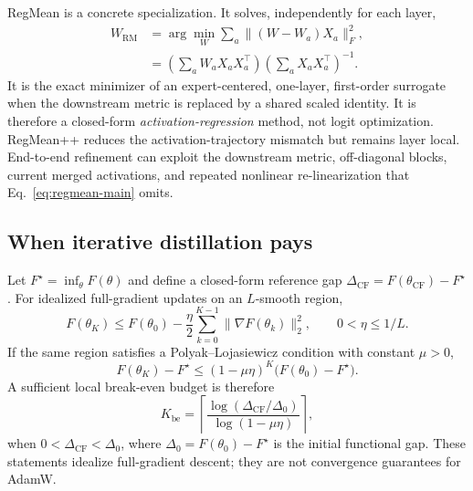 \documentclass[letterpaper]{article} %
\theoremstyle{plain}
\theoremstyle{definition}
\begin{document}
RegMean is a concrete specialization.
It solves, independently for each layer,
\begin{equation}
\begin{aligned}
W_{\mathrm{RM}}
&=\arg\min_W \sum_a\|(W-W_a)X_a\|_F^2,\\
&=\left(\sum_aW_aX_aX_a^\top\right)
  \left(\sum_aX_aX_a^\top\right)^{-1}.
\end{aligned}
\label{eq:regmean-main}
\end{equation}
It is the exact minimizer of an expert-centered, one-layer, first-order surrogate when the downstream metric is replaced by a shared scaled identity.
It is therefore a closed-form \emph{activation-regression} method, not logit optimization.
RegMean++ reduces the activation-trajectory mismatch but remains layer local.
End-to-end refinement can exploit the downstream metric, off-diagonal blocks, current merged activations, and repeated nonlinear re-linearization that Eq.~\eqref{eq:regmean-main} omits.

\subsection{When iterative distillation pays}
\label{sec:compute-error-main}

Let $F^\star=\inf_\theta F(\theta)$ and define a closed-form reference gap $\Delta_{\mathrm{CF}}=F(\theta_{\mathrm{CF}})-F^\star$.
For idealized full-gradient updates on an $L$-smooth region,
\begin{equation}
F(\theta_K)
\le F(\theta_0)-\frac{\eta}{2}
\sum_{k=0}^{K-1}\|\nabla F(\theta_k)\|_2^2,
\qquad 0<\eta\le 1/L.
\label{eq:compute-descent-main}
\end{equation}
If the same region satisfies a Polyak--Lojasiewicz condition \citep{karimi2016pl} with constant $\mu>0$,
\begin{equation}
F(\theta_K)-F^\star
\le(1-\mu\eta)^K\bigl(F(\theta_0)-F^\star\bigr).
\label{eq:compute-rate-main}
\end{equation}
A sufficient local break-even budget is therefore
\begin{equation}
K_{\mathrm{be}}=
\left\lceil
\frac{\log(\Delta_{\mathrm{CF}}/\Delta_0)}
     {\log(1-\mu\eta)}
\right\rceil,
\label{eq:break-even-main}
\end{equation}
when $0<\Delta_{\mathrm{CF}}<\Delta_0$, where $\Delta_0=F(\theta_0)-F^\star$ is the initial functional gap.
These statements idealize full-gradient descent; they are not convergence guarantees for AdamW.
\end{document}
